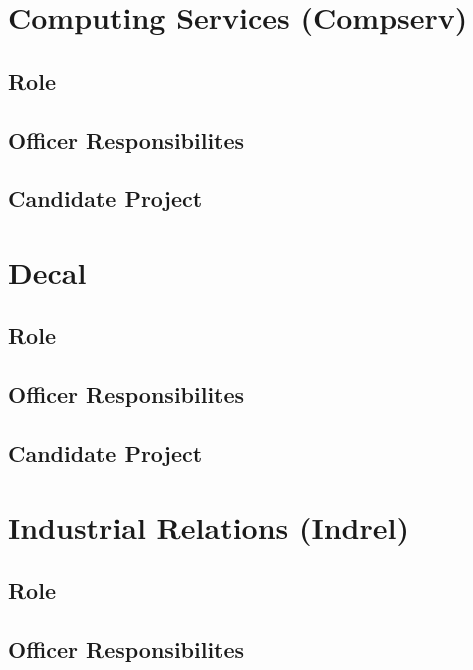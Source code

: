 \documentclass[11pt, article, oneside]{memoir}
\begin{document}
    \bigbreak


    \section{Computing Services (Compserv)}
    \subsection{Role}

    \subsection{Officer Responsibilites}

    \subsection{Candidate Project}

    \bigbreak

    
    \section{Decal}
    \subsection{Role}

    \subsection{Officer Responsibilites}

    \subsection{Candidate Project}

    \bigbreak

    
    \section{Industrial Relations (Indrel)}
    \subsection{Role}

    \subsection{Officer Responsibilites}
\end{document}
